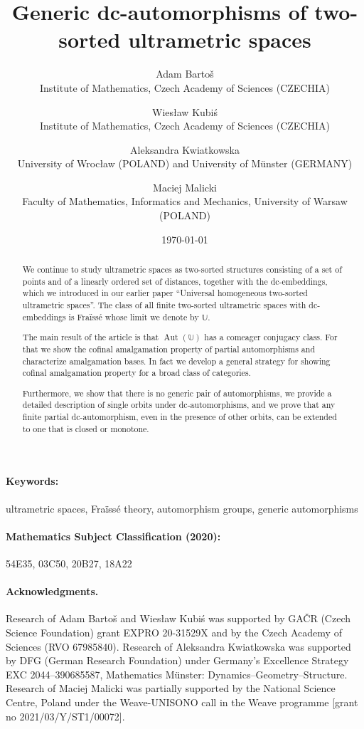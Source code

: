 \documentclass[oneside,notitlepage,12pt]{article}
\title{Generic dc-automorphisms of two-sorted ultrametric spaces}
\author{
{\sc Adam Barto\v{s}}
    \email{bartos@math.cas.cz}\\
    {\small Institute of Mathematics, Czech Academy of Sciences (CZECHIA)}
\and
{\sc Wies{\l}aw Kubi\'s}
    \email{kubis@math.cas.cz}\\
    {\small Institute of Mathematics, Czech Academy of Sciences (CZECHIA)}
\and
{\sc Aleksandra Kwiatkowska}
    \email{aleksandra.kwiatkowska@math.uni.wroc.pl}\\
    {\small University of Wrocław (POLAND) and  University of M\"unster (GERMANY)}
\and
{\sc Maciej Malicki}
    \email{mmalicki@mimuw.edu.pl}\\
    {\small Faculty of Mathematics, Informatics and Mechanics, University of Warsaw (POLAND)}
}
\date{\clocktime\today}
\theoremstyle{definition}
\theoremstyle{remark}
\newcommand \U {\mathbb{U}}
\newcommand \Aut {\operatorname{Aut}}
\begin{document}
\maketitle



\begin{abstract}
We continue to study ultrametric spaces as two-sorted structures consisting of a set
of points and of a linearly ordered set of distances, together with the dc-embeddings, which we introduced in our earlier paper ``Universal homogeneous two-sorted ultrametric spaces''. The class of all finite two-sorted ultrametric spaces with dc-embeddings is Fraïssé whose limit we denote by $\U$.

The main result of the article is  that $\Aut(\U)$ has a comeager conjugacy class. For that we show the cofinal amalgamation property of partial automorphisms and characterize amalgamation bases. In fact we develop a general strategy for showing cofinal amalgamation property for a broad class of categories.

Furthermore, we show that there is no generic pair of automorphisms, we provide a detailed description of single orbits under dc-automorphisms, and we prove that any finite partial dc-automorphism, even in the presence of other
orbits, can be extended to one that is closed or monotone. 
\end{abstract}

\paragraph{Keywords:}
ultrametric spaces, Fraïssé theory, automorphism groups, generic automorphisms

\vspace{-2ex}
\paragraph{Mathematics Subject Classification (2020): }
54E35, %
03C50, %
20B27, %
18A22  %

\color{black}

\vspace{-2ex}
\paragraph{Acknowledgments.} 
Research of Adam Bartoš and Wiesław Kubiś was supported by GAČR (Czech Science Foundation) grant EXPRO 20-31529X and by the Czech Academy of Sciences (RVO 67985840). Research of Aleksandra Kwiatkowska was supported by DFG (German Research Foundation) under Germany’s Excellence Strategy EXC 2044–390685587, Mathematics M\"{u}nster: Dynamics–Geometry–Structure. Research of Maciej Malicki was partially supported by the National Science Centre, Poland
under the Weave-UNISONO call in the Weave programme [grant no
2021/03/Y/ST1/00072].
\end{document}
